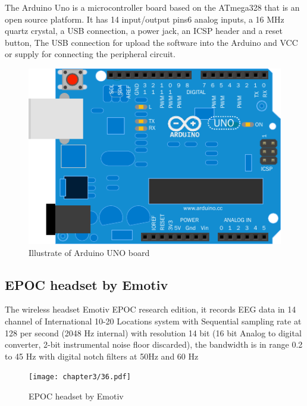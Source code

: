 \hspace{1.5cm} The Arduino Uno is a microcontroller board based on the ATmega328 that is an open source platform. It has 14 input/output pins6 analog inputs, a 16 MHz quartz crystal, a USB connection, a power jack, an ICSP header and a reset button, The USB connection for upload the software into the Arduino and VCC or supply for connecting the peripheral circuit.   
\begin{figure}[ht]
	\centering
	\includegraphics[scale = 0.8]{chapter3/38.pdf}
	\caption{Illustrate of Arduino UNO board}
\end{figure}

\subsection{EPOC headset by Emotiv\texttrademark\cite{ref12}}

\hspace{1.5cm} The wireless headset Emotiv EPOC research edition, it records EEG data in 14 channel of International 10-20 Locations system with Sequential sampling rate at 128 per second (2048 Hz internal) with resolution 14 bit (16 bit Analog to digital converter, 2-bit instrumental noise floor discarded), the bandwidth is in range 0.2 to 45 Hz with digital notch filters at 50Hz and 60 Hz

\begin{figure}[ht]
	\centering
	\texttt{[image: chapter3/36.pdf]}
	\caption{EPOC headset by Emotiv\texttrademark}
\end{figure}

